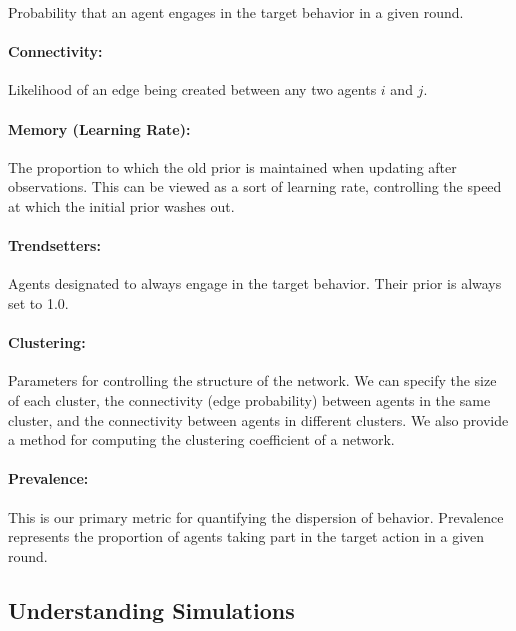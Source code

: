 \documentclass[11pt]{article}
\begin{document}
Probability that an agent engages in the target behavior in a given
round.

\hypertarget{connectivity}{%
\paragraph{Connectivity:}\label{connectivity}}

Likelihood of an edge being created between any two agents \(i\) and
\(j\).

\hypertarget{memory-learning-rate}{%
\paragraph{Memory (Learning Rate):}\label{memory-learning-rate}}

The proportion to which the old prior is maintained when updating after
observations. This can be viewed as a sort of learning rate, controlling
the speed at which the initial prior washes out.

\hypertarget{trendsetters}{%
\paragraph{Trendsetters:}\label{trendsetters}}

Agents designated to always engage in the target behavior. Their prior
is always set to 1.0.

\hypertarget{clustering}{%
\paragraph{Clustering:}\label{clustering}}

Parameters for controlling the structure of the network. We can specify
the size of each cluster, the connectivity (edge probability) between
agents in the same cluster, and the connectivity between agents in
different clusters. We also provide a method for computing the
clustering coefficient of a network.

\hypertarget{prevalence}{%
\paragraph{Prevalence:}\label{prevalence}}

This is our primary metric for quantifying the dispersion of behavior.
Prevalence represents the proportion of agents taking part in the target
action in a given round.

\hypertarget{understanding-simulations}{%
\subsection{Understanding Simulations}\label{understanding-simulations}}
\end{document}
